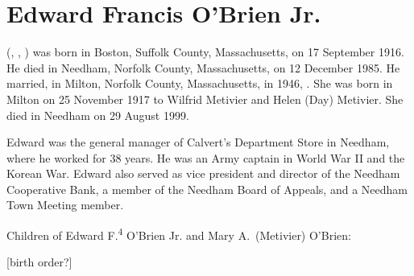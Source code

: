 \section{Edward Francis O'Brien Jr.}\label{per:Edward4OBrien}

 (, , ) was born in Boston, Suffolk County, Massachusetts, on 17 September 1916.\cite{Edward4OBrien2Birth} He died in Needham, Norfolk County, Massachusetts, on 12 December 1985.\cite{Edward4OBrien2Death,Edward2OBrien2Obit} He married, in Milton, Norfolk County, Massachusetts, in 1946, .\cite{Edward4OBrien2Marriage} She was born in Milton on 25 November 1917 to Wilfrid Metivier and Helen (Day) Metivier.\cite{MaryMetivierBirth} She died in Needham on 29 August 1999.\cite{MaryMetivierDeath}

Edward was the general manager of Calvert's Department Store in Needham, where he worked for 38 years. He was an Army captain in World War II and the Korean War. Edward also served as vice president and director of the Needham Cooperative Bank, a member of the Needham Board of Appeals, and a Needham Town Meeting member.\cite{Edward4OBrien2Obit}

\begin{KidsIntro}
	Children of Edward F.\textsuperscript{4} O'Brien Jr. and Mary A.\ (Metivier) O'Brien:
\end{KidsIntro}

\begin{Kids}
	
	
	
\end{Kids}

[birth order?]